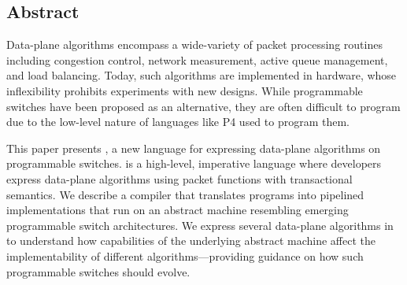 \subsection*{Abstract}

Data-plane algorithms encompass a wide-variety of packet processing routines
including congestion control, network measurement, active queue management, and
load balancing. Today, such algorithms are implemented in hardware, whose
inflexibility prohibits experiments with new designs. While programmable
switches have been proposed as an alternative, they are often difficult to
program due to the low-level nature of languages like P4 used to program them.

This paper presents \pktlanguage, a new language for expressing data-plane
algorithms on programmable switches. \pktlanguage is a high-level, imperative
language where developers express data-plane algorithms using packet functions
with transactional semantics. We describe a compiler that translates
\pktlanguage programs into pipelined implementations that run on an abstract
machine resembling emerging programmable switch architectures. We express
several data-plane algorithms in \pktlanguage to understand how capabilities of
the underlying abstract machine affect the implementability of different
algorithms---providing guidance on how such programmable switches should
evolve.
